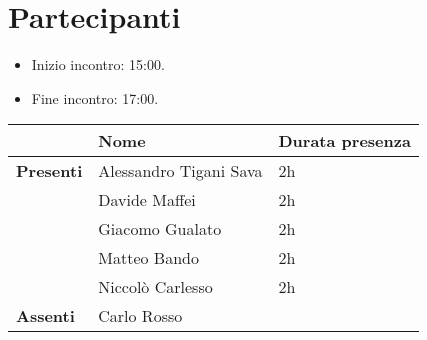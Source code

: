 \section{Partecipanti}

\begin{itemize}
    \item Inizio incontro: 15:00.
    \item Fine incontro: 17:00.
\end{itemize}


\begin{center}
	{\renewcommand{\arraystretch}{1.5}
	\begin{tabular}{lll}
							& \textbf{Nome}  & \textbf{Durata presenza} \\
		\hline
		\textbf{Presenti}   & Alessandro Tigani Sava 	& 2h     	\\
							& Davide Maffei				& 2h		\\
							& Giacomo Gualato			& 2h		\\
							& Matteo Bando				& 2h		\\
							& Niccolò Carlesso			& 2h		\\
		\hline
		\textbf{Assenti}	& Carlo Rosso				& 			\\
	\end{tabular}	
	}
	\end{center}